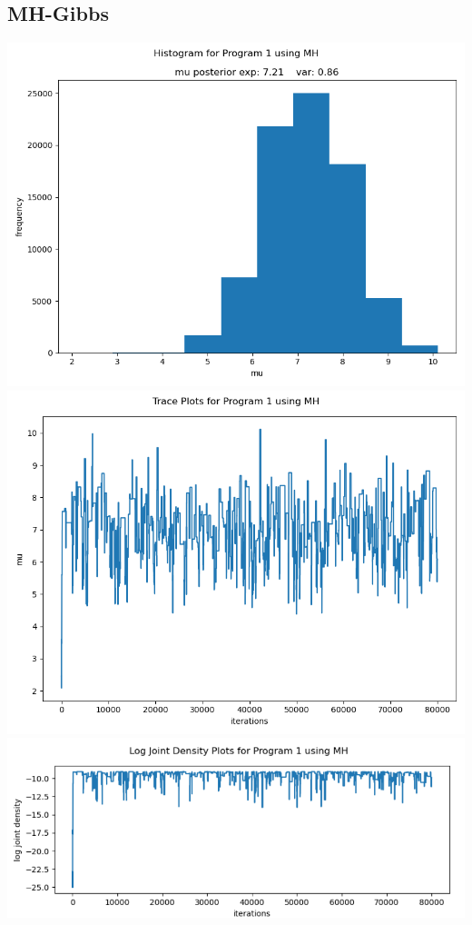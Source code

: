 \documentclass[10pt]{homeworg}
\begin{document}
\subsection{MH-Gibbs}
\begin{center}
\includegraphics[scale=0.5]{figures/MH_program_1.png}
\includegraphics[scale=0.5]{figures/trace_MH_program_1.png}
\includegraphics[scale=0.58]{figures/log_joint_MH_program_1.png}
\end{center}
\end{document}
